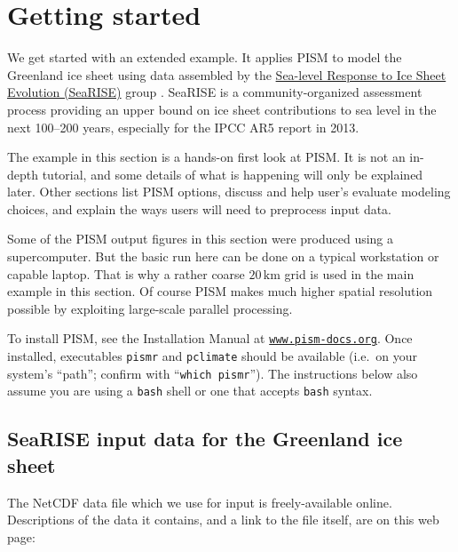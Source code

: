 
\section{Getting started}\label{sec:start}

We get started with an extended example.  It applies PISM to model the Greenland ice sheet using data assembled by the \href{http://websrv.cs.umt.edu/isis/index.php/SeaRISE_Assessment}{Sea-level Response to Ice Sheet Evolution (SeaRISE)} group \cite{Bindshadler2012SeaRISE}.  SeaRISE is a community-organized assessment process providing an upper bound on ice sheet contributions to sea level in the next 100--200 years, especially for the IPCC AR5 report in 2013.

The example in this section is a hands-on first look at PISM.  It is not an in-depth tutorial, and some details of what is happening will only be explained later.  Other sections list PISM options, discuss and help user's evaluate modeling choices, and explain the ways users will need to preprocess input data.

Some of the PISM output figures in this section were produced using a supercomputer.  But the basic run here can be done on a typical workstation or capable laptop.  That is why a rather coarse $20\,\textrm{km}$ grid is used in the main example in this section.  Of course PISM makes much higher spatial resolution possible by exploiting large-scale parallel processing.

To install PISM, see the Installation Manual at \href{http://www.pism-docs.org}{\texttt{www.pism-docs.org}}.
Once installed, executables \texttt{pismr} and \texttt{pclimate} should be available (i.e.~on your system's ``path''; confirm with ``\texttt{which pismr}'').  The instructions below also assume you are using a \texttt{bash} shell or one that accepts \texttt{bash} syntax.


\subsection{SeaRISE input data for the Greenland ice sheet}

The NetCDF data file which we use for input is freely-available online.  Descriptions of the data it contains, and a link to the file itself, are on this web page: 
\medskip

\centerline{}
\medskip

